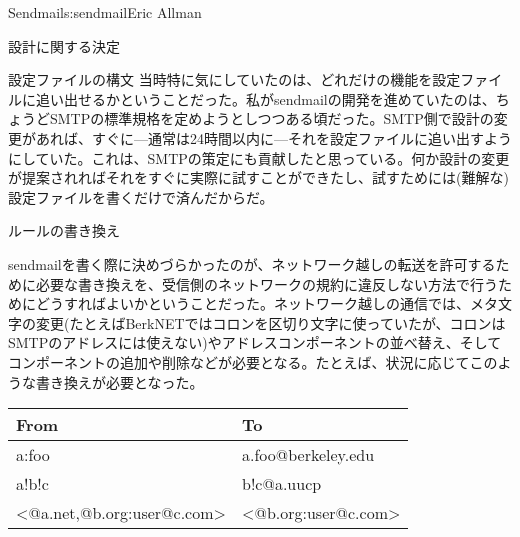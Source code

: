 \begin{aosachapter}{Sendmail}{s:sendmail}{Eric Allman}
\begin{aosasect1}{設計に関する決定}
\begin{aosasect2}{設定ファイルの構文}
当時特に気にしていたのは、どれだけの機能を設定ファイルに追い出せるかということだった。私がsendmailの開発を進めていたのは、ちょうどSMTPの標準規格を定めようとしつつある頃だった。SMTP側で設計の変更があれば、すぐに---通常は24時間以内に---それを設定ファイルに追い出すようにしていた。これは、SMTPの策定にも貢献したと思っている。何か設計の変更が提案されればそれをすぐに実際に試すことができたし、試すためには(難解な)設定ファイルを書くだけで済んだからだ。

\end{aosasect2}

\begin{aosasect2}{ルールの書き換え}

sendmailを書く際に決めづらかったのが、ネットワーク越しの転送を許可するために必要な書き換えを、受信側のネットワークの規約に違反しない方法で行うためにどうすればよいかということだった。ネットワーク越しの通信では、メタ文字の変更(たとえばBerkNETではコロンを区切り文字に使っていたが、コロンはSMTPのアドレスには使えない)やアドレスコンポーネントの並べ替え、そしてコンポーネントの追加や削除などが必要となる。たとえば、状況に応じてこのような書き換えが必要となった。

\begin{table}[h!]\centering
\begin{tabular}{|ll|}
\hline
From & To \\
\hline
a:foo & a.foo@berkeley.edu \\
a!b!c & b!c@a.uucp \\
{\textless}@a.net,@b.org:user@c.com{\textgreater} & {\textless}@b.org:user@c.com{\textgreater} \\
\hline
\end{tabular}
\end{table}


\end{aosasect2}
\end{aosasect1}
\end{aosachapter}
